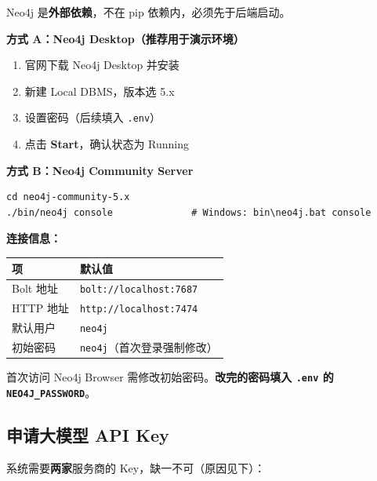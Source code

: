 \documentclass[UTF8,a4paper,11pt]{ctexrep}
\begin{document}
Neo4j 是\textbf{外部依赖}，不在 pip 依赖内，必须先于后端启动。

\textbf{方式 A：Neo4j Desktop（推荐用于演示环境）}

\begin{enumerate}
\item 官网下载 Neo4j Desktop 并安装
\item 新建 Local DBMS，版本选 5.x
\item 设置密码（后续填入 \texttt{.env}）
\item 点击 \textbf{Start}，确认状态为 Running
\end{enumerate}
\textbf{方式 B：Neo4j Community Server}

\begin{Verbatim}[breaklines=true,breakanywhere=true,fontsize=\small,frame=single,framesep=4pt,rulecolor=\color{codeframe}]
cd neo4j-community-5.x
./bin/neo4j console              # Windows: bin\neo4j.bat console
\end{Verbatim}

\textbf{连接信息：}

\begin{center}
\small
\begin{tabularx}{\linewidth}{@{}XX@{}}
\toprule
项 & 默认值 \\
\midrule
Bolt 地址 & \texttt{bolt://localhost:7687} \\
HTTP 地址 & \texttt{http://localhost:7474} \\
默认用户 & \texttt{neo4j} \\
初始密码 & \texttt{neo4j}（首次登录强制修改） \\
\bottomrule
\end{tabularx}
\end{center}
\begin{notebox}
首次访问 Neo4j Browser 需修改初始密码。\textbf{改完的密码填入 \texttt{.env} 的 \texttt{NEO4J\_PASSWORD}}。

\end{notebox}


\subsection{申请大模型 API Key}

系统需要\textbf{两家}服务商的 Key，缺一不可（原因见下）：
\end{document}

